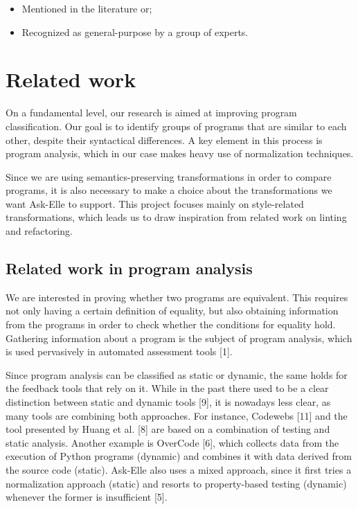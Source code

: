 \documentclass[a4paperpaper,]{report}
\providecommand{\tightlist}{%
  \setlength{\itemsep}{0pt}\setlength{\parskip}{0pt}}
\begin{document}
\begin{itemize}
\tightlist
\item
  Mentioned in the literature or;
\item
  Recognized as general-purpose by a group of experts.
\end{itemize}

\hypertarget{related-work}{%
\chapter{Related work}\label{related-work}}

On a fundamental level, our research is aimed at improving program
classification. Our goal is to identify groups of programs that are
similar to each other, despite their syntactical differences. A key
element in this process is program analysis, which in our case makes
heavy use of normalization techniques.

Since we are using semantics-preserving transformations in order to
compare programs, it is also necessary to make a choice about the
transformations we want Ask-Elle to support. This project focuses mainly
on style-related transformations, which leads us to draw inspiration
from related work on linting and refactoring.

\hypertarget{related-work-in-program-analysis}{%
\section{Related work in program
analysis}\label{related-work-in-program-analysis}}

We are interested in proving whether two programs are equivalent. This
requires not only having a certain definition of equality, but also
obtaining information from the programs in order to check whether the
conditions for equality hold. Gathering information about a program is
the subject of program analysis, which is used pervasively in automated
assessment tools {[}1{]}.

Since program analysis can be classified as static or dynamic, the same
holds for the feedback tools that rely on it. While in the past there
used to be a clear distinction between static and dynamic tools {[}9{]},
it is nowadays less clear, as many tools are combining both approaches.
For instance, Codewebs {[}11{]} and the tool presented by Huang et al.
{[}8{]} are based on a combination of testing and static analysis.
Another example is OverCode {[}6{]}, which collects data from the
execution of Python programs (dynamic) and combines it with data derived
from the source code (static). Ask-Elle also uses a mixed approach,
since it first tries a normalization approach (static) and resorts to
property-based testing (dynamic) whenever the former is insufficient
{[}5{]}.
\end{document}
